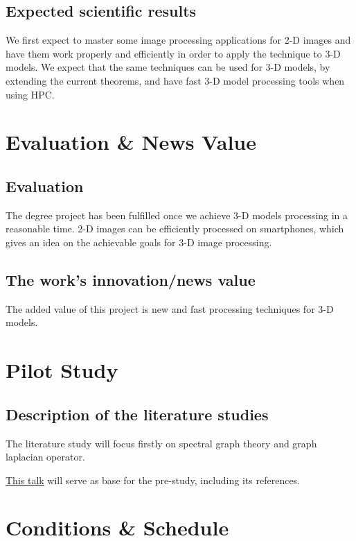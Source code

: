 \documentclass[12pt]{article}
\begin{document}
\subsection*{Expected scientific results}

We first expect to master some image processing applications for 2-D images and have them work properly and efficiently in order to apply the technique to 3-D models.
We expect that the same techniques can be used for 3-D models, by extending the current theorems, and have fast 3-D model processing tools when using HPC.

\section*{Evaluation \& News Value}

\subsection*{Evaluation}

The degree project has been fulfilled once we achieve 3-D models processing in a reasonable time.
2-D images can be efficiently processed on smartphones, which gives an idea on the achievable goals for 3-D image processing.

\subsection*{The work's innovation/news value}

The added value of this project is new and fast processing techniques for 3-D models.

\section*{Pilot Study}

\subsection*{Description of the literature studies}

The literature study will focus firstly on spectral graph theory and graph laplacian operator.

\href{https://www.pathlms.com/siam/courses/2426/sections/3234}{This talk} will serve as base for the pre-study, including its references.

\section*{Conditions \& Schedule}
\end{document}
